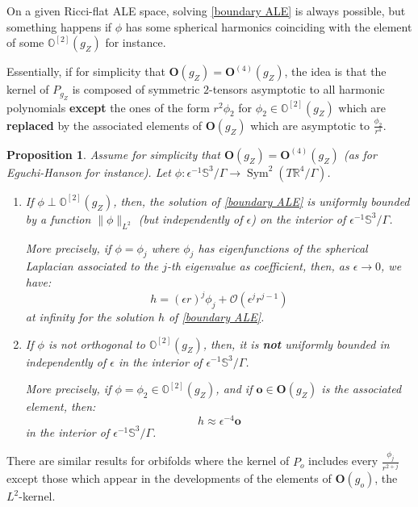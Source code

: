 \documentclass[12pt]{article}
\newtheorem{prop}[thm]{Proposition}
\begin{document}
   On a given Ricci-flat ALE space, solving \eqref{boundary ALE} is always possible, but something happens if $\phi$ has some spherical harmonics coinciding with the element of some $\mathbb{O}^{[2]}({g_Z})$ for instance. 
   
   Essentially, if for simplicity that $\mathbf{O}({g_Z}) = \mathbf{O}^{(4)}({g_Z})$, the idea is that the kernel of $P_{{g_Z}}$ is composed of symmetric $2$-tensors asymptotic to all harmonic polynomials \textbf{except} the ones of the form $r^2\phi_2$ for $\phi_2\in\mathbb{O}^{[2]}({g_Z})$ which are \textbf{replaced} by the associated elements of $\mathbf{O}({g_Z})$ which are asymptotic to $\frac{\phi_2}{r^4}$.
   
   
   \begin{prop}
        Assume for simplicity that $\mathbf{O}({g_Z}) = \mathbf{O}^{(4)}({g_Z})$ (as for Eguchi-Hanson for instance). Let $\phi: \epsilon^{-1}\mathbb{S}^3\slash\Gamma \to \operatorname{Sym}^2(T\mathbb{R}^4\slash\Gamma)$.
        
        \begin{enumerate}
            \item If $\phi \perp \mathbb{O}^{[2]}({g_Z})$, then, the solution of \eqref{boundary ALE} is uniformly bounded by a function $\|\phi\|_{L^2}$ (but independently of $\epsilon$) on the interior of $\epsilon^{-1}\mathbb{S}^3\slash\Gamma$.
            
            More precisely, if $\phi = \phi_j$ where $\phi_j$ has eigenfunctions of the spherical Laplacian associated to the $j$-th eigenvalue as coefficient, then, as $\epsilon\to 0$, we have:
            $$ h = (\epsilon r)^j\phi_j + \mathcal{O}(\epsilon^j r^{j-1}) $$
            at infinity for the solution $h$ of \eqref{boundary ALE}.
            \item If $\phi$ is not orthogonal to $\mathbb{O}^{[2]}({g_Z})$, then, it is \textbf{not} uniformly bounded in independently of $\epsilon$ in the interior of $\epsilon^{-1}\mathbb{S}^3\slash\Gamma$.
            
            More precisely, if $\phi = \phi_2 \in \mathbb{O}^{[2]}({g_Z})$, and if $\mathbf{o}\in\mathbf{O}({g_Z})$ is the associated element, then:
            $$ h \approx \epsilon^{-4}\mathbf{o} $$
            in the interior of $\epsilon^{-1}\mathbb{S}^3\slash\Gamma$.
        \end{enumerate}
   \end{prop}
   
   There are similar results for orbifolds where the kernel of $P_o$ includes every $\frac{\phi_j}{r^{2+j}}$ except those which appear in the developments of the elements of $\mathbf{O}(g_o)$, the $L^2$-kernel.
   
\end{document}
